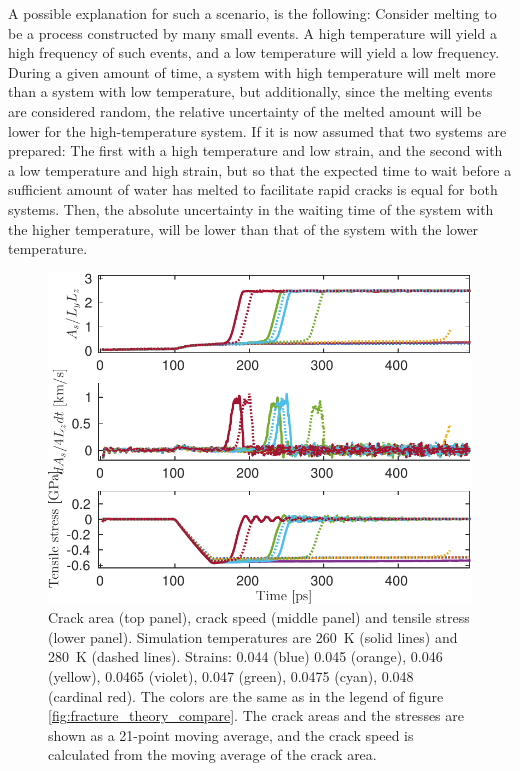 A possible explanation for such a scenario, is the following: Consider melting to be a process constructed by many small events. A high temperature will yield a high frequency of such events, and a low temperature will yield a low frequency. During a given amount of time, a system with high temperature will melt more than a system with low temperature, but additionally, since the melting events are considered random, the relative uncertainty of the melted amount will be lower for the high-temperature system. If it is now assumed that two systems are prepared: The first with a high temperature and low strain, and the second with a low temperature and high strain, but so that the expected time to wait before a sufficient amount of water has melted to facilitate rapid cracks is equal for both systems. Then, the absolute uncertainty in the waiting time of the system with the higher temperature, will be lower than that of the system with the lower temperature.

\begin{figure}
\centering
\includegraphics[width=12cm]{../figures/thesis/area_speed_stress_all.pdf}
\caption{Crack area (top panel), crack speed (middle panel) and tensile stress (lower panel). Simulation temperatures are \SI{260}{\kelvin} (solid lines) and \SI{280}{\kelvin} (dashed lines). Strains: 0.044 (blue) 0.045 (orange), 0.046 (yellow), 0.0465 (violet), 0.047 (green), 0.0475 (cyan), 0.048 (cardinal red). The colors are the same as in the legend of figure \ref{fig:fracture_theory_compare}. The crack areas and the stresses are shown as a 21-point moving average, and the crack speed is calculated from the moving average of the crack area.}
\label{fig:area_speed_stress_all}
\end{figure}

